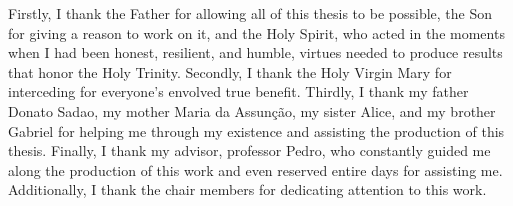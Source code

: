 Firstly, I thank the Father for allowing all of this thesis to be possible, the Son for giving a reason to work on it, and the Holy Spirit, who acted in the moments when I had been honest, resilient, and humble, virtues needed to produce results that honor the Holy Trinity. Secondly, I thank the Holy Virgin Mary for interceding for everyone's envolved true benefit. Thirdly, I thank my father Donato Sadao, my mother Maria da Assunção, my sister Alice, and my brother Gabriel for helping me through my existence and assisting the production of this thesis. Finally, I thank my advisor, professor Pedro, who constantly guided me along the production of this work and even reserved entire days for assisting me. Additionally, I thank the chair members for dedicating attention to this work.
